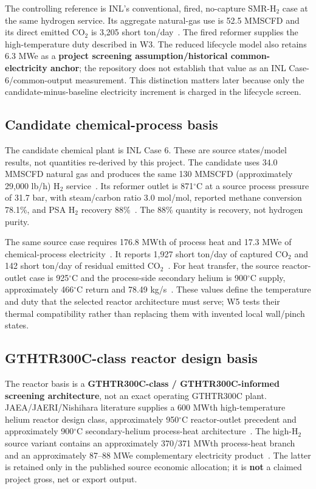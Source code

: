 The controlling reference is INL's conventional, fired, no-capture SMR-H$_2$ case at the same hydrogen service. Its aggregate natural-gas use is 52.5 MMSCFD and its direct emitted CO$_2$ is 3,205 short ton/day~\cite{inltev953}. The fired reformer supplies the high-temperature duty described in W3. The reduced lifecycle model also retains 6.3 MWe as a \textbf{project screening assumption/historical common-electricity anchor}; the repository does not establish that value as an INL Case-6/common-output measurement. This distinction matters later because only the candidate-minus-baseline electricity increment is charged in the lifecycle screen.

\BoundaryComparisonFigure

\subsection{Candidate chemical-process basis}
The candidate chemical plant is INL Case 6. These are source states/model results, not quantities re-derived by this project. The candidate uses 34.0 MMSCFD natural gas and produces the same 130 MMSCFD (approximately 29,000 lb/h) H$_2$ service~\cite{inltev953,inltev961}. Its reformer outlet is 871$^\circ$C at a source process pressure of 31.7 bar, with steam/carbon ratio 3.0 mol/mol, reported methane conversion 78.1\%, and PSA H$_2$ recovery 88\%~\cite{inltev953,inltev961}. The 88\% quantity is recovery, not hydrogen purity.

The same source case requires 176.8 MWth of process heat and 17.3 MWe of chemical-process electricity~\cite{inltev961}. It reports 1,927 short ton/day of captured CO$_2$ and 142 short ton/day of residual emitted CO$_2$~\cite{inltev961}. For heat transfer, the source reactor-outlet case is 925$^\circ$C and the process-side secondary helium is 900$^\circ$C supply, approximately 466$^\circ$C return and 78.49 kg/s~\cite{inltev961}. These values define the temperature and duty that the selected reactor architecture must serve; W5 tests their thermal compatibility rather than replacing them with invented local wall/pinch states.

\subsection{GTHTR300C-class reactor design basis}
The reactor basis is a \textbf{GTHTR300C-class / GTHTR300C-informed screening architecture}, not an exact operating GTHTR300C plant. JAEA/JAERI/Nishihara literature supplies a 600 MWth high-temperature helium reactor design class, approximately 950$^\circ$C reactor-outlet precedent and approximately 900$^\circ$C secondary-helium process-heat architecture~\cite{jaeri2004gthtr300c,nishihara2007potential}. The high-H$_2$ source variant contains an approximately 370/371 MWth process-heat branch and an approximately 87--88 MWe complementary electricity product~\cite{nishihara2007potential}. The latter is retained only in the published source economic allocation; it is \textbf{not} a claimed project gross, net or export output.

